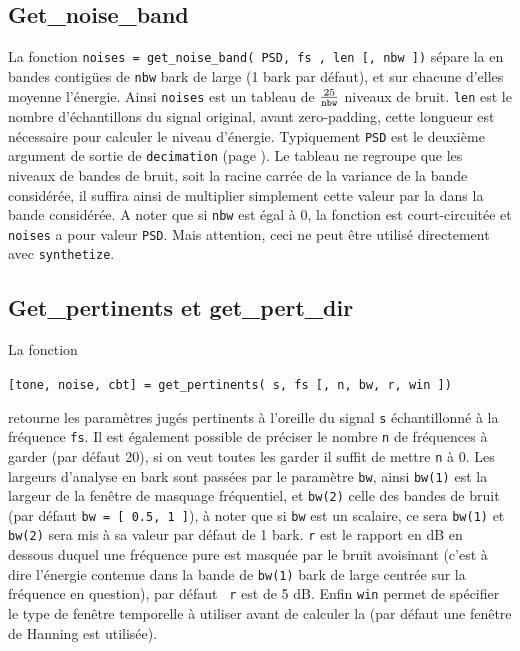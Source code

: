     \subsection{Get\_noise\_band}
    \label{getnoiseband}
    La fonction {\tt noises = get\_noise\_band( PSD, fs , len [, nbw ])} s{\'e}pare
    la  en bandes contig{\"u}es de {\tt nbw} bark de
    large (1 bark par d{\'e}faut), et sur chacune d'elles moyenne
    l'{\'e}nergie. Ainsi {\tt noises} est un tableau de $\frac{25}{\tt nbw}$
    niveaux de bruit. {\tt len} est le nombre d'{\'e}chantillons du signal original,
    avant zero-padding, cette longueur est n{\'e}cessaire pour calculer le niveau d'{\'e}nergie.
    Typiquement {\tt PSD} est le deuxi{\`e}me argument
    de sortie de {\tt decimation} (page \pageref{decimation}).
    Le tableau ne regroupe que les niveaux de bandes de bruit,
    soit la racine carr{\'e}e de la variance de la bande consid{\'e}r{\'e}e,
    il suffira ainsi de multiplier simplement cette valeur par
    la \dsp dans la bande consid{\'e}r{\'e}e. A noter que si {\tt nbw} est
    {\'e}gal {\`a} 0, la fonction est court-circuit{\'e}e et {\tt noises} a
    pour valeur {\tt PSD}. Mais attention, ceci ne peut {\^e}tre
    utilis{\'e} directement avec {\tt synthetize}.\\


    \newpage
    \subsection{Get\_pertinents et get\_pert\_dir}
    \label{getpertinents}
    La fonction
    \begin{center}
    {\tt [tone, noise, cbt] = get\_pertinents( s, fs [, n, bw, r, win ])}
    \end{center}
    retourne les param{\`e}tres jug{\'e}s pertinents {\`a} l'oreille du signal
    {\tt s} {\'e}chantillonn{\'e} {\`a} la fr{\'e}quence {\tt fs}. Il est
    {\'e}galement possible de pr{\'e}ciser le nombre {\tt n} de fr{\'e}quences {\`a}
    garder (par d{\'e}faut 20), si on veut toutes les garder il suffit de
    mettre {\tt n} {\`a} 0. Les largeurs d'analyse en bark sont
    pass{\'e}es par le param{\`e}tre {\tt bw}, ainsi {\tt bw(1)} est la
    largeur de la fen{\^e}tre de masquage fr{\'e}quentiel, et {\tt bw(2)}
    celle des bandes de bruit (par d{\'e}faut {\tt bw = [ 0.5, 1 ]}),
    {\`a} noter que si {\tt bw} est un scalaire, ce sera {\tt bw(1)}
    et {\tt bw(2)} sera mis {\`a} sa valeur par d{\'e}faut de 1 bark.
    {\tt r} est le rapport en dB en dessous duquel une
    fr{\'e}quence pure est masqu{\'e}e par le bruit avoisinant (c'est {\`a}
    dire l'{\'e}nergie contenue dans la bande de {\tt bw(1)} bark de
    large centr{\'e}e sur la fr{\'e}quence en question), par d{\'e}faut {\tt
    r} est de 5 dB. Enfin {\tt win} permet de sp{\'e}cifier le type
    de fen{\^e}tre temporelle {\`a} utiliser avant de calculer la \dsp (par
    d{\'e}faut une fen{\^e}tre de Hanning est utilis{\'e}e).\\

